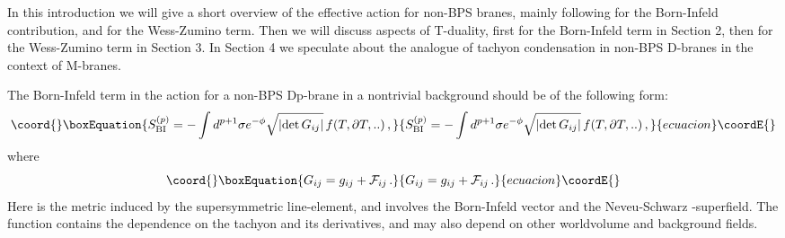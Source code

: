 \documentclass[12pt,a4paper]{article}
\begin{document}
In this introduction we will give a short overview of the effective action
 for non-BPS branes, mainly following \cite{Sen5} for the Born-Infeld
 contribution, and \cite{Billo,Ken} for the Wess-Zumino term. Then we will
 discuss aspects of T-duality, first for the Born-Infeld term in Section 2,
 then for the Wess-Zumino term in Section 3. In  Section 4 we
 speculate about the analogue of tachyon condensation in non-BPS
 D-branes in the context of \coordHE{} M-branes.

The Born-Infeld term in the action for  a non-BPS Dp-brane in a nontrivial
 background should be of the following
 form:
\begin{equation}\coord{}\boxEquation{
\label{SBI}
   S^{(p)}_{{\rm BI}} = -\int d^{p+1}\sigma e^{-\phi} \sqrt{|{\rm det}\, G_{ij}|}
        \, f(T,\partial T,..)\,,
}{
S^{(p)}_{{\rm BI}} = -\int d^{p+1}\sigma e^{-\phi} \sqrt{|{\rm det}\, G_{ij}|}
        \, f(T,\partial T,..)\,,
}{ecuacion}\coordE{}\end{equation}
where
\begin{equation}\coord{}\boxEquation{
   G_{ij} = g_{ij} + {\cal F}_{ij}\,.
}{
   G_{ij} = g_{ij} + {\cal F}_{ij}\,.
}{ecuacion}\coordE{}\end{equation}
Here \coordHE{} is the metric induced by the supersymmetric line-element, and
 \coordHE{} involves the Born-Infeld vector
 \coordHE{} and the Neveu-Schwarz
 \coordHE{}-superfield. The function \coordHE{} contains the dependence on the tachyon and
 its derivatives, and may also depend on other worldvolume and background
 fields.
\end{document}
